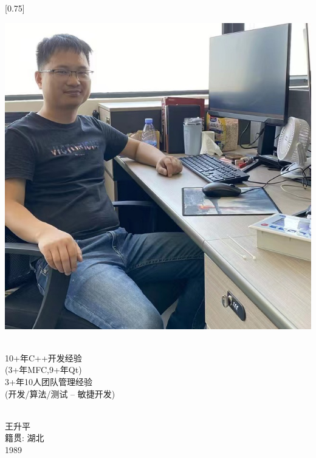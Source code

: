 \documentclass[lighthipster]{simplehipstercv}
\begin{document}
	\setlength{\columnsep}{1.5cm}
	[0.75]
	\begin{paracol}{2}
		
		\paracolbackgroundoptions
		
		
		
		\footnotesize
		{\setasidefontcolour
			\flushright
			\begin{center}
				\includegraphics[width=\linewidth]{ShowMe.jpg}
			\end{center}
			\bigskip
			
			\\[0.5em]
			
			{
				\footnotesize
				10+年C++开发经验\\
				\tiny
				(3+年MFC,9+年Qt)\\
				\footnotesize
				3+年10人团队管理经验\\
				\tiny
				(开发/算法/测试 -- 敏捷开发)
			}
			\bigskip
			
			 \\[0.5em]
			王升平\\
			籍贯: 湖北\\ 
			1989
			
}
\end{paracol}
\end{document}

